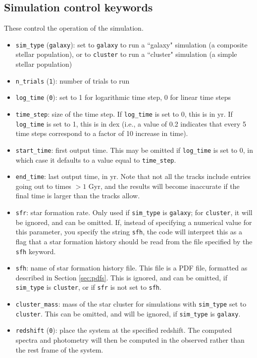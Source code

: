 \documentclass[12pt]{article}
\begin{document}
\subsection{Simulation control keywords}

These control the operation of the simulation.
\begin{itemize}
\item \verb=sim_type= (\verb=galaxy=): set to \verb=galaxy= to run a ``galaxy" simulation (a composite stellar population), or to \verb=cluster= to run a ``cluster" simulation (a simple stellar population)
\item \verb=n_trials= (\verb=1=): number of trials to run
\item \verb=log_time= (\verb=0=): set to 1 for logarithmic time step, 0 for linear time steps
\item \verb=time_step=: size of the time step. If \verb=log_time= is set to 0, this is in yr. If \verb=log_time= is set to 1, this is in dex (i.e., a value of 0.2 indicates that every 5 time steps correspond to a factor of 10 increase in time).
\item \verb=start_time=: first output time. This may be omitted if \verb=log_time= is set to 0, in which case it defaults to a value equal to \verb=time_step=.
\item \verb=end_time=: last output time, in yr. Note that not all the tracks include entries going out to times $>1$ Gyr, and the results will become inaccurate if the final time is larger than the tracks allow.
\item \verb=sfr=: star formation rate. Only used if \verb=sim_type= is \verb=galaxy=; for \verb=cluster=, it will be ignored, and can be omitted. If, instead of specifying a numerical value for this parameter, you specify the string \verb=sfh=, the code will interpret this as a flag that a star formation history should be read from the file specified by the \verb=sfh= keyword.
\item \verb=sfh=: name of star formation history file. This file is a PDF file, formatted as described in Section \ref{sec:pdfs}. This is ignored, and can be omitted, if \verb=sim_type= is \verb=cluster=, or if \verb=sfr= is not set to \verb=sfh=.
\item \verb=cluster_mass=: mass of the star cluster for simulations with \verb=sim_type= set to \verb=cluster=. This can be omitted, and will be ignored, if \verb=sim_type= is \verb=galaxy=.
\item \verb=redshift= (\verb=0=): place the system at the specified redshift. The computed spectra and photometry will then be computed in the observed rather than the rest frame of the system.
\end{itemize}
\end{document}
